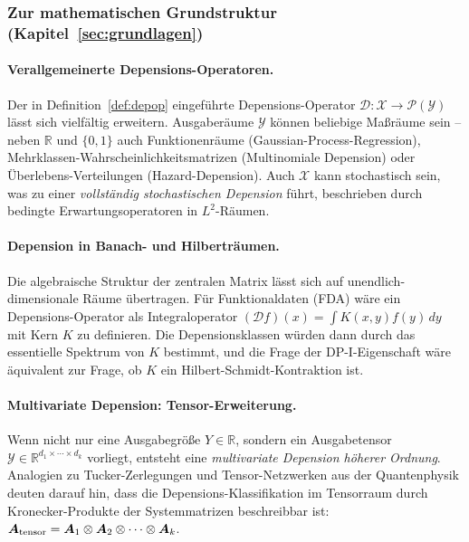 ﻿\documentclass[12pt, a4paper]{article}
\theoremstyle{definition}
\theoremstyle{remark}
\newcommand{\R}{\mathbb{R}}
\newcommand{\vA}{\bm{A}}
\begin{document}
\subsubsection{Zur mathematischen Grundstruktur (Kapitel~\ref{sec:grundlagen})}

\paragraph{Verallgemeinerte Depensions-Operatoren.}
\begin{sloppypar}
Der in Definition~\ref{def:depop} eingeführte Depensions-Operator
$\mathcal{D}: \mathcal{X} \to \mathcal{P}(\mathcal{Y})$ lässt sich vielfältig
erweitern. Ausgaberäume $\mathcal{Y}$ können beliebige Maßräume sein --
neben $\R$ und $\{0,1\}$ auch Funktionenräume (Gaussian-Process-Regression),
Mehrklassen-Wahrscheinlichkeitsmatrizen (Multinomiale Depension) oder
Überlebens-Verteilungen (Hazard-Depension).
Auch $\mathcal{X}$ kann stochastisch sein, was zu einer
\emph{vollständig stochastischen Depension} führt, beschrieben durch
bedingte Erwartungsoperatoren in $L^2$-Räumen.
\end{sloppypar}

\paragraph{Depension in Banach- und Hilberträumen.}
Die algebraische Struktur der zentralen Matrix lässt sich auf unendlich-dimensionale
Räume übertragen. Für Funktionaldaten (FDA) wäre ein Depensions-Operator als
Integraloperator $(\mathcal{D}f)(x) = \int K(x,y)f(y)\,dy$ mit Kern $K$ zu
definieren. Die Depensionsklassen würden dann durch das essentielle Spektrum von $K$
bestimmt, und die Frage der DP-I-Eigenschaft wäre äquivalent zur Frage, ob $K$ ein
Hilbert-Schmidt-Kontraktion ist.

\paragraph{Multivariate Depension: Tensor-Erweiterung.}
Wenn nicht nur eine Ausgabegröße $Y \in \R$, sondern ein Ausgabetensor
$\mathcal{Y} \in \R^{d_1 \times \cdots \times d_k}$ vorliegt, entsteht eine
\emph{multivariate Depension höherer Ordnung}. Analogien zu Tucker-Zerlegungen
und Tensor-Netzwerken aus der Quantenphysik deuten darauf hin, dass die
Depensions-Klassifikation im Tensorraum durch Kronecker-Produkte der Systemmatrizen
beschreibbar ist: $\vA_{\rm tensor} = \vA_1 \otimes \vA_2 \otimes \cdots \otimes \vA_k$.
\end{document}
